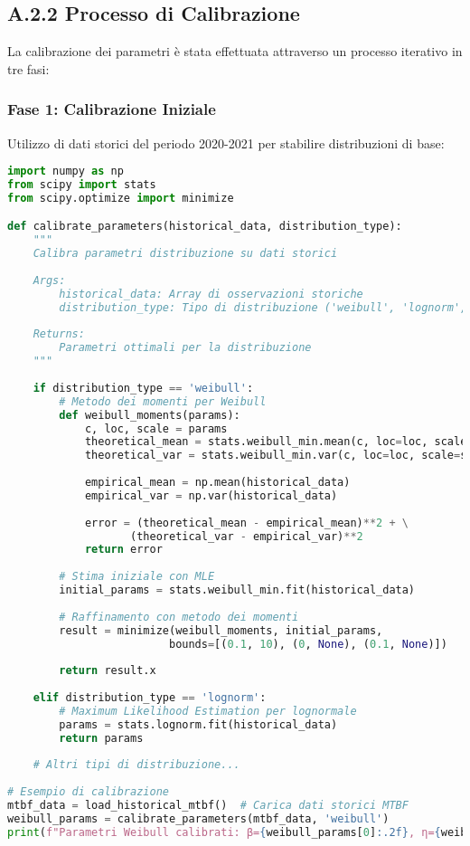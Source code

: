 \subsection{A.2.2 Processo di Calibrazione}

La calibrazione dei parametri è stata effettuata attraverso un processo iterativo in tre fasi:

\subsubsection{Fase 1: Calibrazione Iniziale}

Utilizzo di dati storici del periodo 2020-2021 per stabilire distribuzioni di base:

\begin{lstlisting}[language=Python, caption=Calibrazione Parametri Base]
import numpy as np
from scipy import stats
from scipy.optimize import minimize

def calibrate_parameters(historical_data, distribution_type):
    """
    Calibra parametri distribuzione su dati storici
    
    Args:
        historical_data: Array di osservazioni storiche
        distribution_type: Tipo di distribuzione ('weibull', 'lognorm', etc.)
    
    Returns:
        Parametri ottimali per la distribuzione
    """
    
    if distribution_type == 'weibull':
        # Metodo dei momenti per Weibull
        def weibull_moments(params):
            c, loc, scale = params
            theoretical_mean = stats.weibull_min.mean(c, loc=loc, scale=scale)
            theoretical_var = stats.weibull_min.var(c, loc=loc, scale=scale)
            
            empirical_mean = np.mean(historical_data)
            empirical_var = np.var(historical_data)
            
            error = (theoretical_mean - empirical_mean)**2 + \
                   (theoretical_var - empirical_var)**2
            return error
        
        # Stima iniziale con MLE
        initial_params = stats.weibull_min.fit(historical_data)
        
        # Raffinamento con metodo dei momenti
        result = minimize(weibull_moments, initial_params, 
                         bounds=[(0.1, 10), (0, None), (0.1, None)])
        
        return result.x
    
    elif distribution_type == 'lognorm':
        # Maximum Likelihood Estimation per lognormale
        params = stats.lognorm.fit(historical_data)
        return params
    
    # Altri tipi di distribuzione...
    
# Esempio di calibrazione
mtbf_data = load_historical_mtbf()  # Carica dati storici MTBF
weibull_params = calibrate_parameters(mtbf_data, 'weibull')
print(f"Parametri Weibull calibrati: β={weibull_params[0]:.2f}, η={weibull_params[2]:.1f}")
\end{lstlisting}

